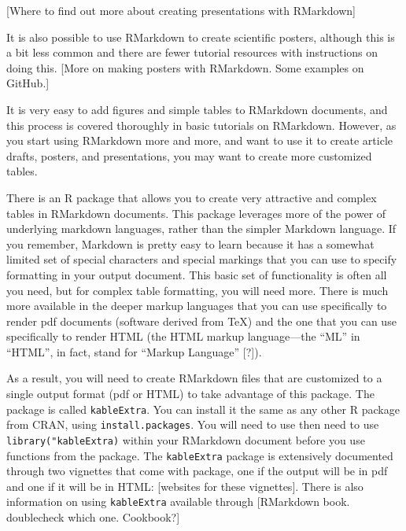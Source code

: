\documentclass[]{tufte-book}
\begin{document}
{[}Where to find out more about creating presentations with RMarkdown{]}

It is also possible to use RMarkdown to create scientific posters, although this
is a bit less common and there are fewer tutorial resources with instructions on
doing this. {[}More on making posters with RMarkdown. Some examples on GitHub.{]}

It is very easy to add figures and simple tables to RMarkdown documents, and
this process is covered thoroughly in basic tutorials on RMarkdown. However,
as you start using RMarkdown more and more, and want to use it to create
article drafts, posters, and presentations, you may want to create more
customized tables.

There is an R package that allows you to create very attractive and complex
tables in RMarkdown documents. This package leverages more of the power of
underlying markdown languages, rather than the simpler Markdown language. If you
remember, Markdown is pretty easy to learn because it has a somewhat limited set
of special characters and special markings that you can use to specify
formatting in your output document. This basic set of functionality is often all
you need, but for complex table formatting, you will need more. There is much
more available in the deeper markup languages that you can use specifically to
render pdf documents (software derived from TeX) and the one that you can use
specifically to render HTML (the HTML markup language---the ``ML'' in ``HTML'', in
fact, stand for ``Markup Language'' {[}?{]}).

As a result, you will need to create RMarkdown files that are customized to a
single output format (pdf or HTML) to take advantage of this package. The
package is called \texttt{kableExtra}. You can install it the same as any other R
package from CRAN, using \texttt{install.packages}. You will need to use then need to
use \texttt{library("kableExtra)} within your RMarkdown document before you use
functions from the package. The \texttt{kableExtra} package is extensively documented
through two vignettes that come with package, one if the output will be in pdf
and one if it will be in HTML: {[}websites for these vignettes{]}. There is also
information on using \texttt{kableExtra} available through {[}RMarkdown book. doublecheck
which one. Cookbook?{]}
\end{document}

